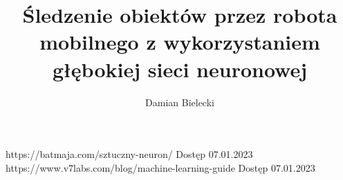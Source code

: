 \documentclass[12pt,twoside]{article}
\author{Damian Bielecki}
\title{Śledzenie obiektów przez robota mobilnego z wykorzystaniem głębokiej sieci neuronowej}
\begin{document}
\maketitle

\blankpage

\tableofcontents

\clearpage
\blankpage







\clearpage

\begin{thebibliography}{4}
     https://batmaja.com/sztuczny-neuron/ Dostęp 07.01.2023
     https://www.v7labs.com/blog/machine-learning-guide Dostęp 07.01.2023
\end{thebibliography}

\clearpage

\end{document}
